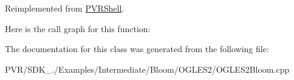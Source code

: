 Reimplemented from \hyperlink{class_p_v_r_shell_ae0eb5f797cbe993a22b8659f9c332578}{P\+V\+R\+Shell}.



Here is the call graph for this function\+:




The documentation for this class was generated from the following file\+:\begin{DoxyCompactItemize}
\item 
P\+V\+R/\+S\+D\+K\+\_./\+Examples/\+Intermediate/\+Bloom/\+O\+G\+L\+E\+S2/O\+G\+L\+E\+S2\+Bloom.\+cpp\end{DoxyCompactItemize}
